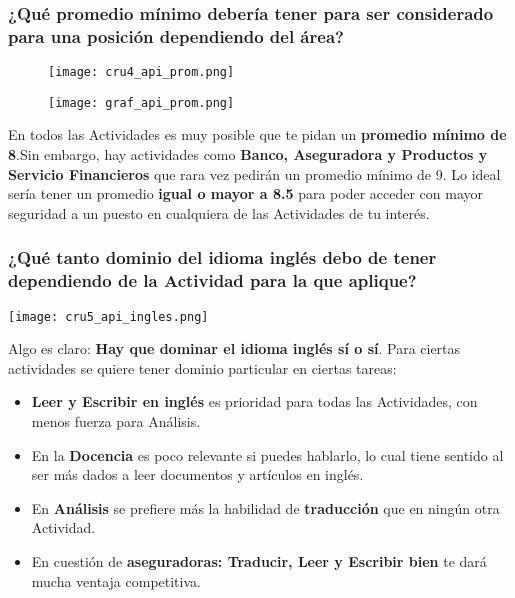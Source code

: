 \documentclass{article}
\begin{document}
\subsubsection{¿Qué promedio mínimo debería tener para ser considerado para una posición dependiendo del área?}

\begin{figure}[h!]
\centering
\begin{minipage}{.5\textwidth}
  \centering
  \texttt{[image: cru4\_api\_prom.png]}
\end{minipage}%
\begin{minipage}{.5\textwidth}
  \centering
  \texttt{[image: graf\_api\_prom.png]}
\end{minipage}
\end{figure}

En todos las Actividades es muy posible que te pidan un \textbf{promedio mínimo de 8}.Sin embargo, hay actividades como \textbf{Banco, Aseguradora y Productos y Servicio Financieros} que rara vez pedirán un promedio mínimo de 9. Lo ideal sería tener un promedio \textbf{igual o mayor a 8.5} para poder acceder con mayor seguridad a un puesto en cualquiera de las Actividades de tu interés.

\subsubsection{¿Qué tanto dominio del idioma inglés debo de tener dependiendo de la Actividad para la que aplique?}

\begin{center}
    \texttt{[image: cru5\_api\_ingles.png]}
\end{center}

Algo es claro: \textbf{Hay que dominar el idioma inglés sí o sí}. Para ciertas actividades se quiere tener dominio particular en ciertas tareas: 

\begin{itemize}
    \item \textbf{Leer y Escribir en inglés} es prioridad para todas las Actividades, con menos fuerza para Análisis.
    
    \item En la \textbf{Docencia} es poco relevante si puedes hablarlo, lo cual tiene sentido al ser más dados a leer documentos y artículos en inglés. 
    
    \item En \textbf{Análisis} se prefiere más la habilidad de \textbf{traducción} que en ningún otra Actividad. 
    
    \item En cuestión de \textbf{aseguradoras: Traducir, Leer y Escribir bien} te dará mucha ventaja competitiva. 
\end{itemize}
\end{document}
